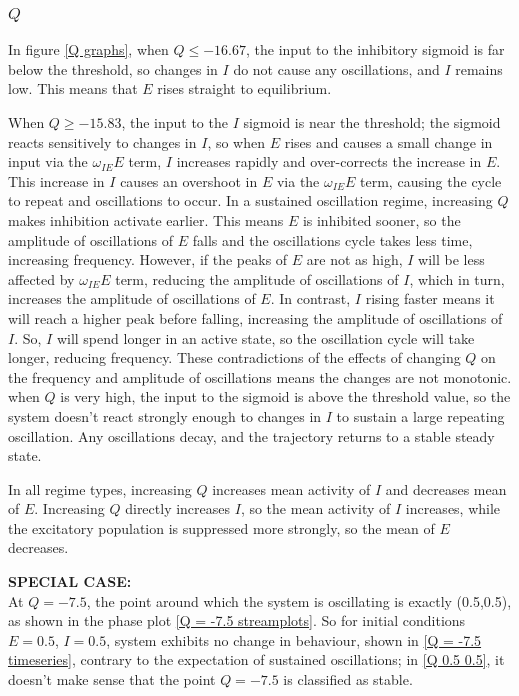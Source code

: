 \documentclass[10pt]{article}
\begin{document}
\begin{flushleft}
\subsubsection{$Q$}

In figure \ref{Q graphs}, when $Q \leq -16.67$, the input to the inhibitory sigmoid is far below the threshold, so changes in $I$ do not cause any oscillations, and $I$ remains low. This means that $E$ rises straight to equilibrium. 

When $Q \geq -15.83$, the input to the $I$ sigmoid is near the threshold; the sigmoid reacts sensitively to changes in $I$, so when $E$ rises and causes a small change in input via the $\omega_{IE}E$ term, $I$ increases rapidly and over-corrects the increase in $E$. This increase in $I$ causes an overshoot in $E$ via the $\omega_{IE} E$ term, causing the cycle to repeat and oscillations to occur. In a sustained oscillation regime, increasing $Q$ makes inhibition activate earlier. This means $E$ is inhibited sooner, so the amplitude of oscillations of $E$ falls and the oscillations cycle takes less time, increasing frequency. However, if the peaks of $E$ are not as high, $I$ will be less affected by $\omega_{IE}E$ term, reducing the amplitude of oscillations of $I$, which in turn, increases the amplitude of oscillations of $E$. In contrast, $I$ rising faster means it will reach a higher peak before falling, increasing the amplitude of oscillations of $I$. So, $I$ will spend longer in an active state, so the oscillation cycle will take longer, reducing frequency. These contradictions of the effects of changing $Q$ on the frequency and amplitude of oscillations means the changes are not monotonic. when $Q$ is very high, the input to the sigmoid is above the threshold value, so the system doesn't react strongly enough to changes in $I$ to sustain a large repeating oscillation. Any oscillations decay, and the trajectory returns to a stable steady state.
\newline

In all regime types, increasing $Q$ increases mean activity of $I$ and decreases mean of $E$. Increasing $Q$ directly increases $I$, so the mean activity of $I$ increases, while the excitatory population is suppressed more strongly, so the mean of $E$ decreases.
\newline

\textbf{SPECIAL CASE:} \\
At $Q = -7.5$, the point around which the system is oscillating is exactly (0.5,0.5), as shown in the phase plot \ref{Q = -7.5 streamplots}. So for initial conditions $E = 0.5$, $I=0.5$, system exhibits no change in behaviour, shown in \ref{Q = -7.5 timeseries}, contrary to the expectation of sustained oscillations; in \ref{Q 0.5 0.5}, it doesn't make sense that the point $Q=-7.5$ is classified as stable.


\end{flushleft}
\end{document}
